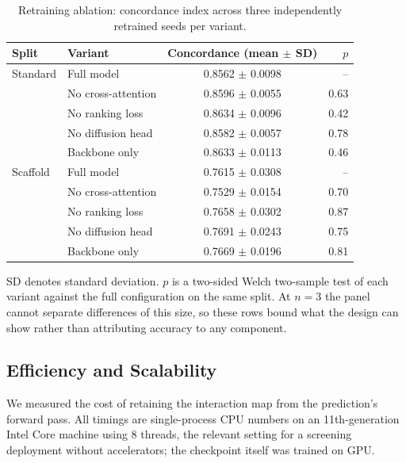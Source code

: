 \documentclass{ieeeaccess}
\begin{document}
\begin{table}[!t]
\caption{Retraining ablation: concordance index across three independently
retrained seeds per variant.}
\label{tab:ablation}
\centering
\begin{threeparttable}
\begin{tabular}{llcr}
\toprule
Split & Variant & \shortstack{Concordance\\(mean $\pm$ SD)} & $p$ \\
\midrule
Standard & Full model         & 0.8562 $\pm$ 0.0098 & -- \\
         & No cross-attention & 0.8596 $\pm$ 0.0055 & 0.63 \\
         & No ranking loss    & 0.8634 $\pm$ 0.0096 & 0.42 \\
         & No diffusion head  & 0.8582 $\pm$ 0.0057 & 0.78 \\
         & Backbone only      & 0.8633 $\pm$ 0.0113 & 0.46 \\
\midrule
Scaffold & Full model         & 0.7615 $\pm$ 0.0308 & -- \\
         & No cross-attention & 0.7529 $\pm$ 0.0154 & 0.70 \\
         & No ranking loss    & 0.7658 $\pm$ 0.0302 & 0.87 \\
         & No diffusion head  & 0.7691 $\pm$ 0.0243 & 0.75 \\
         & Backbone only      & 0.7669 $\pm$ 0.0196 & 0.81 \\
\bottomrule
\end{tabular}
\begin{tablenotes}[flushleft]\footnotesize\raggedright
\item SD denotes standard deviation.
$p$ is a two-sided Welch two-sample test of each variant against the full
configuration on the same split. At $n = 3$ the panel cannot separate
differences of this size, so these rows bound what the design can show rather
than attributing accuracy to any component.
\end{tablenotes}
\end{threeparttable}
\end{table}

\subsection{Efficiency and Scalability}
\label{sec:efficiency}
We measured the cost of retaining the interaction map from the prediction's
forward pass. All
timings are single-process CPU numbers on an 11th-generation Intel Core machine
using 8 threads, the relevant setting for a screening deployment without
accelerators; the checkpoint itself was trained on GPU.
\end{document}
